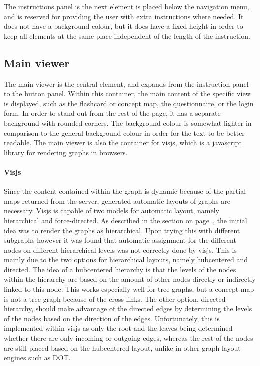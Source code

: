 The instructions panel is the next element is placed below the navigation menu, and is reserved for providing the user with extra instructions where needed. It does not have a background colour, but it does have a fixed height in order to keep all elements at the same place independent of the length of the instruction.

\subsection{Main viewer}

The main viewer is the central element, and expands from the instruction panel to the button panel. Within this container, the main content of the specific view is displayed, such as the flashcard or concept map, the questionnaire, or the login form. In order to stand out from the rest of the page, it has a separate background with rounded corners. The background colour is somewhat lighter in comparison to the general background colour in order for the text to be better readable. The main viewer is also the container for visjs, which is a javascript library for rendering graphs in browsers.

\paragraph{Visjs} Since the content contained within the graph is dynamic because of the partial maps returned from the server, generated automatic layouts of graphs are necessary. Visjs is capable of two models for automatic layout, namely hierarchical and force-directed. As described in the  section on page~\pageref{sec:cmapframework}, the initial idea was to render the graphs as hierarchical. Upon trying this with different subgraphs however it was found that automatic assignment for the different nodes on different hierarchical levels was not correctly done by visjs. This is mainly due to the two options for hierarchical layouts, namely hubcentered and directed. The idea of a hubcentered hierarchy is that the levels of the nodes within the hierarchy are based on the amount of other nodes directly or indirectly linked to this node. This works especially well for tree graphs, but a concept map is not a tree graph because of the cross-links. The other option, directed hierarchy, should make advantage of the directed edges by determining the levels of the nodes based on the direction of the edges. Unfortunately, this is implemented within visjs as only the root and the leaves being determined whether there are only incoming or outgoing edges, whereas the rest of the nodes are still placed based on the hubcentered layout, unlike in other graph layout engines such as DOT. 

